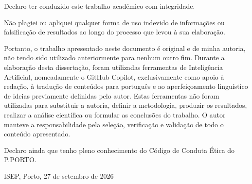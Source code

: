 
\frontmatter %

\pagestyle{plain} %


\maketitlepage


\begin{soi}

Declaro ter conduzido este trabalho acad\'emico com integridade.

N\~ao plagiei ou apliquei qualquer forma de uso indevido de informa\c{c}\~oes ou falsifica\c{c}\~ao de resultados ao longo do processo que levou \`a sua elabora\c{c}\~ao.

Portanto, o trabalho apresentado neste documento \'e original e de minha autoria, n\~ao tendo sido utilizado anteriormente para nenhum outro fim. Durante a elabora\c{c}\~ao desta disserta\c{c}\~ao, foram utilizadas ferramentas de Intelig\^encia Artificial, nomeadamente o GitHub Copilot, exclusivamente como apoio \`a reda\c{c}\~ao, \`a tradu\c{c}\~ao de conte\'udos para portugu\^es e ao aperfei\c{c}oamento lingu\'istico de ideias previamente definidas pelo autor. Estas ferramentas n\~ao foram utilizadas para substituir a autoria, definir a metodologia, produzir os resultados, realizar a an\'alise cient\'ifica ou formular as conclus\~oes do trabalho. O autor manteve a responsabilidade pela sele\c{c}\~ao, verifica\c{c}\~ao e valida\c{c}\~ao de todo o conte\'udo apresentado.

Declaro ainda que tenho pleno conhecimento do C\'odigo de Conduta \'Etica do P.PORTO.

ISEP, Porto, 27 de setembro de 2026

\end{soi}


